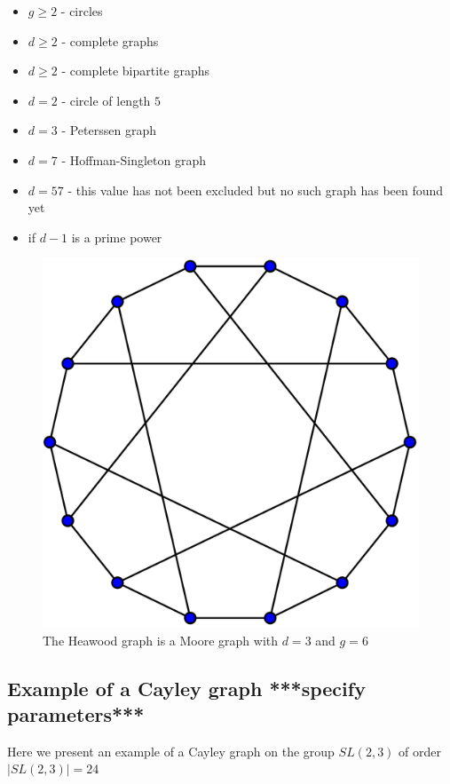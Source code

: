 \documentclass[a4paper,12pt,oneside]{report}%
\begin{document}
\begin{itemize}
	\item{$g \geq 2$ - circles}
	\item{$d \geq 2$ - complete graphs}
	\item{$d \geq 2$ - complete bipartite graphs}
	\item{$d=2$ - circle of length $5$}
	\item[]{\makebox[2cm]{\hfill}$d=3$ - Peterssen graph}
	\item[]{\makebox[2cm]{\hfill}$d=7$ - Hoffman-Singleton graph}
	\item[]{\makebox[2cm]{\hfill}$d=57$ - this value has not been excluded but no such graph has been found yet }
	\item{if $d-1$ is a prime power}
\end{itemize}

\begin{figure}[!ht]
	\centering
	\includegraphics[scale=0.15]{Heawood_graph.png}
	\caption{The Heawood graph is a Moore graph with $d=3$ and $g=6$ }
\end{figure}

\subsection{Example of a Cayley graph ***specify parameters***}
Here we present an example of a Cayley graph on the group $SL(2,3)$ of order $|SL(2,3)|=24$
\end{document}

